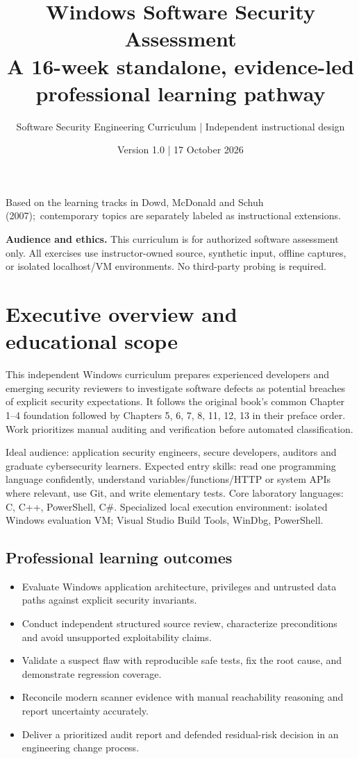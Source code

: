 \documentclass[10pt,letterpaper]{article}
\title{\vspace{-1.6cm}\Huge\color{navy}\bfseries Windows Software Security Assessment\\[8pt]\large\color{teal}A 16-week standalone, evidence-led professional learning pathway}
\author{Software Security Engineering Curriculum | Independent instructional design}
\date{Version 1.0 | 17 October 2026}
\begin{document}
\maketitle
\begin{center}\small Based on the learning tracks in Dowd, McDonald and Schuh (2007);\
contemporary topics are separately labeled as instructional extensions.\end{center}
\begin{insight}\textbf{Audience and ethics.} This curriculum is for authorized software assessment only. All exercises use instructor-owned source, synthetic input, offline captures, or isolated localhost/VM environments. No third-party probing is required.\end{insight}
\tableofcontents
\clearpage
\section{Executive overview and educational scope}
This independent Windows curriculum prepares experienced developers and emerging security reviewers to investigate software defects as potential breaches of explicit security expectations. It follows the original book's common Chapter 1--4 foundation followed by Chapters 5, 6, 7, 8, 11, 12, 13 in their preface order. Work prioritizes manual auditing and verification before automated classification.

Ideal audience: application security engineers, secure developers, auditors and graduate cybersecurity learners. Expected entry skills: read one programming language confidently, understand variables/functions/HTTP or system APIs where relevant, use Git, and write elementary tests. Core laboratory languages: C, C++, PowerShell, C\#. Specialized local execution environment: isolated Windows evaluation VM; Visual Studio Build Tools, WinDbg, PowerShell.

\subsection{Professional learning outcomes}
\begin{itemize}[leftmargin=*,itemsep=2pt]
\item Evaluate Windows application architecture, privileges and untrusted data paths against explicit security invariants.
\item Conduct independent structured source review, characterize preconditions and avoid unsupported exploitability claims.
\item Validate a suspect flaw with reproducible safe tests, fix the root cause, and demonstrate regression coverage.
\item Reconcile modern scanner evidence with manual reachability reasoning and report uncertainty accurately.
\item Deliver a prioritized audit report and defended residual-risk decision in an engineering change process.
\end{itemize}
\end{document}
